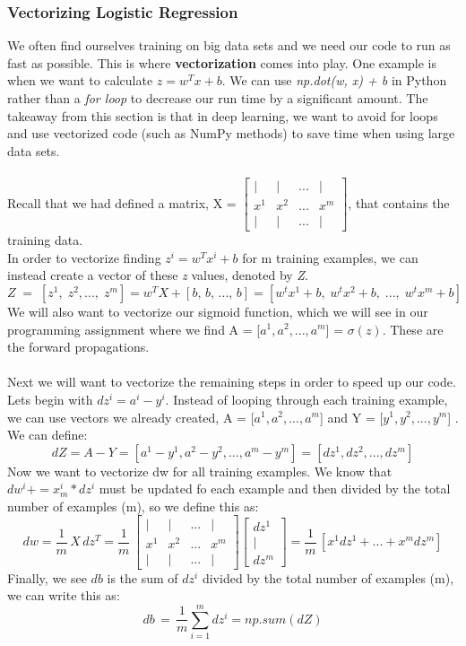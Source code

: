 \documentclass[11pt, a4paper]{article}
\begin{document}
\begin{spacing}{1.1}
	\subsubsection{Vectorizing Logistic Regression}
	We often find ourselves training on big data sets and we need our code to run as fast as possible. This is where \textbf{vectorization} comes into play. One example is when we want to calculate $ z = w^Tx + b$. We can use \textit{np.dot(w, x) + b} in Python rather than a \textit{for loop} to decrease our run time by a significant amount. The takeaway from this section is that in deep learning, we want to avoid for loops and use vectorized code (such as NumPy methods) to save time when using large data sets. \\~\\
	Recall that we had defined a matrix, X = $\begin{bmatrix} | & | & ... & | \\ x^1 & x^2 & ... & x^m \\ | & | & ... & | \end{bmatrix}$, that contains the training data. \vspace*{1mm}\\ In order to vectorize finding $ z^i = w^Tx^i + b$ for m training examples, we can instead create a vector of these \textit{z} values, denoted by \textit{Z}.  $$ Z\; =\; [z^1,\; z^2,...,\; z^m] = w^TX + [b,\, b,\,...,\,b] = [w^tx^1+b,\; w^tx^2+b,\;...,\; w^tx^m+b]$$ 
	We will also want to vectorize our sigmoid function, which we will see in our programming assignment where we find A = [$a^1, a^2,..., a^m$] = $\sigma(z)$. These are the forward propagations. \\~\\
	Next we will want to vectorize the remaining steps in order to speed up our code. Lets begin with $dz^i = a^i - y^i$. Instead of looping through each training example, we can use vectors we already created, A = [$a^1, a^2,..., a^m$]  and Y = [$y^1, y^2,..., y^m$] . We can define: $$ dZ = A - Y = [a^1-y^1, a^2-y^2,..., a^m-y^m] = [dz^1, dz^2, ..., dz^m] $$ Now we want to vectorize dw for all training examples. We know that $dw^i += x^i_m*dz^i$ must be updated fo each example and then divided by the total number of examples (m), so we define this as: $$ dw = \frac{1}{m}\,X\, dz^T = \frac{1}{m}\, \begin{bmatrix} | & | & ... & | \\ x^1 & x^2 & ... & x^m \\ | & | & ... & | \end{bmatrix} \begin{bmatrix} dz^1\\ | \\ dz^m \end{bmatrix}  = \frac{1}{m}\, [x^1dz^1 + ... + x^m dz^m]$$ Finally, we see $db$ is the sum of $dz^i$ divided by the total number of examples (m), we can write this as: $$ db \, = \, \frac{1}{m} \sum_{i=1}^m dz^i = np.sum(dZ)$$

\end{spacing}
\end{document}
